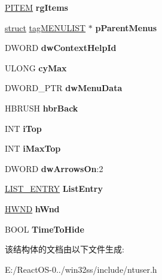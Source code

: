 \begin{DoxyCompactItemize}
\item 
\mbox{\label{structtag_m_e_n_u_afd5a5e3c0fed1798ab27bce0e2ad220e}} 
\hyperlink{structtag_i_t_e_m}{P\+I\+T\+EM} {\bfseries rg\+Items}
\item 
\mbox{\label{structtag_m_e_n_u_aabecb3c7bceb6a8498cf4c761b1836dd}} 
\hyperlink{interfacestruct}{struct} \hyperlink{structtag_m_e_n_u_l_i_s_t}{tag\+M\+E\+N\+U\+L\+I\+ST} $\ast$ {\bfseries p\+Parent\+Menus}
\item 
\mbox{\label{structtag_m_e_n_u_a8fbc4c6fbdb71b86343210ae2c4503a1}} 
D\+W\+O\+RD {\bfseries dw\+Context\+Help\+Id}
\item 
\mbox{\label{structtag_m_e_n_u_ad50919ea759a1bce5fe2e0c2e2dffff2}} 
U\+L\+O\+NG {\bfseries cy\+Max}
\item 
\mbox{\label{structtag_m_e_n_u_abf298384b51bb68acddf7e52bccec31f}} 
D\+W\+O\+R\+D\+\_\+\+P\+TR {\bfseries dw\+Menu\+Data}
\item 
\mbox{\label{structtag_m_e_n_u_af874a2e3b432343b5bff7b77e845a41c}} 
H\+B\+R\+U\+SH {\bfseries hbr\+Back}
\item 
\mbox{\label{structtag_m_e_n_u_adc9922a0749392a6d8a3122c4fc9c3eb}} 
I\+NT {\bfseries i\+Top}
\item 
\mbox{\label{structtag_m_e_n_u_ae790c728a435c10eea19b74d3777adf2}} 
I\+NT {\bfseries i\+Max\+Top}
\item 
\mbox{\label{structtag_m_e_n_u_a9cd02c41ee1fd2f4517ebc0d54dd72d3}} 
D\+W\+O\+RD {\bfseries dw\+Arrows\+On}\+:2
\item 
\mbox{\label{structtag_m_e_n_u_a5761575bcee1193be85045ea6d7a5ea0}} 
\hyperlink{struct___l_i_s_t___e_n_t_r_y}{L\+I\+S\+T\+\_\+\+E\+N\+T\+RY} {\bfseries List\+Entry}
\item 
\mbox{\label{structtag_m_e_n_u_ac9964a1dd427478496e331f57d340c5b}} 
\hyperlink{interfacevoid}{H\+W\+ND} {\bfseries h\+Wnd}
\item 
\mbox{\label{structtag_m_e_n_u_ab66deeb329ff21fbdf4d9836f417aa54}} 
B\+O\+OL {\bfseries Time\+To\+Hide}
\end{DoxyCompactItemize}


该结构体的文档由以下文件生成\+:\begin{DoxyCompactItemize}
\item 
E\+:/\+React\+O\+S-\/0../win32ss/include/ntuser.\+h\end{DoxyCompactItemize}
